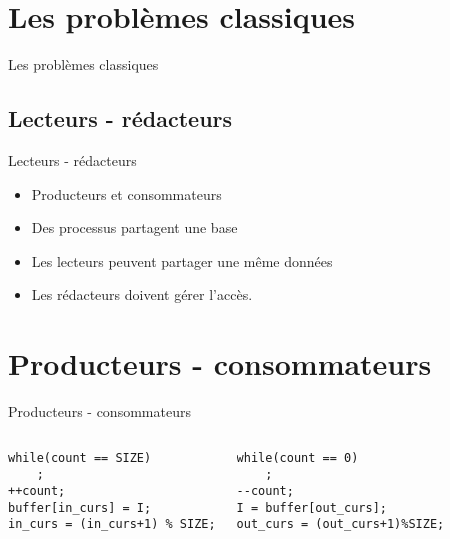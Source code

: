 \def\sectitle{Les problèmes classiques}
\section{\sectitle}
\begin{frame}{\sectitle}
\def\subsectitle{Lecteurs - rédacteurs}
\subsection{\subsectitle}
\begin{block}{\subsectitle}
\begin{itemize}
    \item Producteurs et consommateurs
    \item Des processus partagent une base
    \item Les lecteurs peuvent partager une même données
    \item Les rédacteurs doivent gérer l'accès.
\end{itemize}
\end{block}


\end{frame}

\def\sectitle{Producteurs - consommateurs}
\section{\sectitle}
\begin{frame}[containsverbatim]{\sectitle}

\begin{columns}[t]
\begin{exampleblock}{\subsectitle}
\begin{verbatim}
while(count == SIZE)
    ;
++count;
buffer[in_curs] = I;
in_curs = (in_curs+1) % SIZE;
\end{verbatim}
\end{exampleblock}

\begin{exampleblock}{\subsectitle}
\begin{verbatim}
while(count == 0)
    ;
--count;
I = buffer[out_curs];
out_curs = (out_curs+1)%SIZE;
\end{verbatim}
\end{exampleblock}
\end{columns}

\end{frame}


